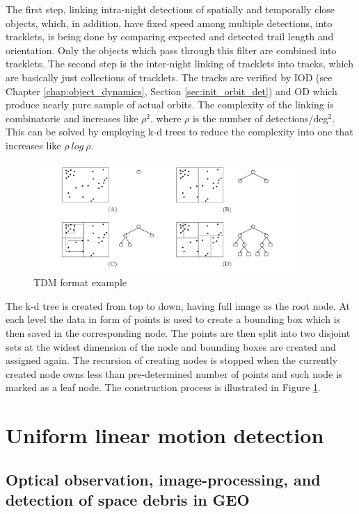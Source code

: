 	The first step, linking intra-night detections of spatially and temporally close objects, which, in addition, have fixed speed among multiple detections, into tracklets, is being done by comparing expected and detected trail length and orientation. Only the objects which pass through this filter are combined into tracklets. The second step is the inter-night linking of tracklets into tracks, which are basically just collections of tracklets. The tracks are verified by IOD (see Chapter \ref{chap:object_dynamics}, Section \ref{sec:init_orbit_det}) and OD which produce nearly pure sample of actual orbits. The complexity of the linking is combinatoric and increases like $\rho^2$, where $\rho$ is the number of detections/deg$^2$. This can be solved by employing k-d trees to reduce the complexity into one that increases like $\rho\ log\ \rho$.
	
	\begin{figure}[H]
	\centering
	  \includegraphics[width=10cm]{images/kd_tree}
		  \caption{TDM format example}
	  \label{fig:kd_tree}
	\end{figure}
	
	The k-d tree is created from top to down, having full image as the root node. At each level the data in form of points is used to create a bounding box which is then saved in the corresponding node. The points are then split into two disjoint sets at the widest dimension of the node and bounding boxes are created and assigned again. The recursion of creating nodes is stopped when the currently created node owns less than pre-determined number of points and such node is marked as a leaf node. The construction process is illustrated in Figure \ref{fig:kd_tree}.
	
	
	
	
	
	
	
	
	
	
	
	
	
	
	
	
	
	
	
	
	
	
	
	
	
	
	
	
	
	
	
	
	
	
	
	
	
	
	
	

\section{Uniform linear motion detection}\label{sec:linear_motion}
\subsection{Optical observation, image-processing, and detection of space debris in GEO}\label{subsec:linear_geo}